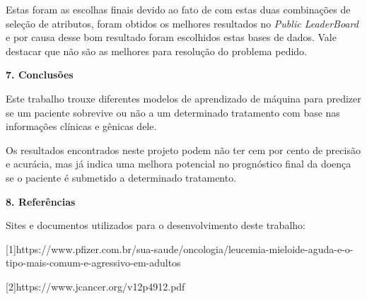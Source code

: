 \documentclass{article}
\begin{document}
\begin{multicols}{2}
Estas foram as escolhas finais devido ao fato de com estas duas combinações de seleção de atributos, foram obtidos os melhores resultados no \textit{Public LeaderBoard} e por causa desse bom resultado foram escolhidos estas bases de dados. Vale destacar que não são as melhores para resolução do problema pedido.

\textbf{7. Conclusões}

Este trabalho trouxe diferentes modelos de aprendizado de máquina para predizer se um paciente sobrevive ou não a um determinado tratamento com base nas informações clínicas e gênicas dele.

Os resultados encontrados neste projeto podem não ter cem por cento de precisão e acurácia, mas já indica uma melhora potencial no prognóstico final da doença se o paciente é submetido a determinado tratamento.

\columnbreak

\textbf{8. Referências}

Sites e documentos utilizados para o desenvolvimento deste trabalho: 

[1]https://www.pfizer.com.br/sua-saude/oncologia/leucemia-mieloide-aguda-e-o-tipo-mais-comum-e-agressivo-em-adultos

[2]https://www.jcancer.org/v12p4912.pdf 


\end{multicols}
\end{document}
